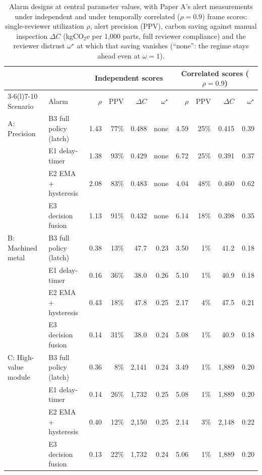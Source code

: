 \begin{table}[!t]
\centering
\footnotesize
\caption{Alarm designs at central parameter values, with Paper A's alert measurements under independent and under temporally correlated ($\rho=0.9$) frame scores: single-reviewer utilization $\rho$, alert precision (PPV), carbon saving against manual inspection $\Delta C$ (kgCO$_2$e per 1{,}000 parts, full reviewer compliance) and the reviewer distrust $\omega^\star$ at which that saving vanishes (``none'': the regime stays ahead even at $\omega=1$).}
\label{tab:alarms}
\setlength{\tabcolsep}{4pt}
\begin{tabular}{@{}llrrrrrrrr@{}}
\toprule
 & & \multicolumn{4}{c}{Independent scores} & \multicolumn{4}{c}{Correlated scores ($\rho=0.9$)} \\
\cmidrule(lr){3-6}\cmidrule(l){7-10}
Scenario & Alarm & $\rho$ & PPV & $\Delta C$ & $\omega^\star$ & $\rho$ & PPV & $\Delta C$ & $\omega^\star$ \\
\midrule
A: Precision & B3 full policy (latch) & 1.43 & 77\% & 0.488 & none & 4.59 & 25\% & 0.415 & 0.39 \\
 & E1 delay-timer & 1.38 & 93\% & 0.429 & none & 6.72 & 25\% & 0.391 & 0.37 \\
 & E2 EMA + hysteresis & 2.08 & 83\% & 0.483 & none & 4.04 & 48\% & 0.460 & 0.62 \\
 & E3 decision fusion & 1.13 & 91\% & 0.432 & none & 6.14 & 18\% & 0.398 & 0.35 \\
\midrule
B: Machined metal & B3 full policy (latch) & 0.38 & 13\% & 47.7 & 0.23 & 3.50 & 1\% & 41.2 & 0.18 \\
 & E1 delay-timer & 0.16 & 36\% & 38.0 & 0.26 & 5.10 & 1\% & 40.9 & 0.18 \\
 & E2 EMA + hysteresis & 0.43 & 18\% & 47.8 & 0.25 & 2.17 & 4\% & 47.5 & 0.21 \\
 & E3 decision fusion & 0.14 & 31\% & 38.0 & 0.24 & 5.08 & 1\% & 40.9 & 0.18 \\
\midrule
C: High-value module & B3 full policy (latch) & 0.36 & 8\% & 2{,}141 & 0.24 & 3.49 & 1\% & 1{,}889 & 0.20 \\
 & E1 delay-timer & 0.14 & 26\% & 1{,}732 & 0.25 & 5.08 & 1\% & 1{,}889 & 0.20 \\
 & E2 EMA + hysteresis & 0.40 & 12\% & 2{,}150 & 0.25 & 2.14 & 3\% & 2{,}148 & 0.22 \\
 & E3 decision fusion & 0.13 & 22\% & 1{,}732 & 0.24 & 5.06 & 1\% & 1{,}889 & 0.20 \\
\bottomrule
\end{tabular}
\end{table}
